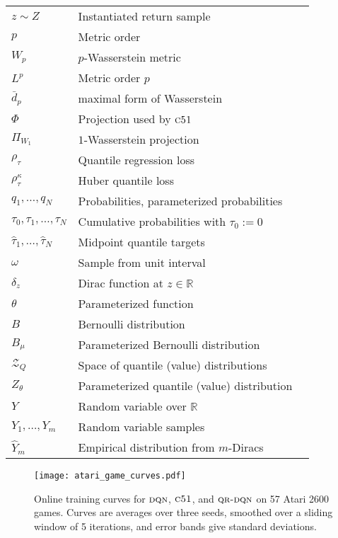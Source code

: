 \documentclass[letterpaper]{article}
\newcommand{\cZ}{\mathcal{Z}}
\def \cfo {\textsc{c51}}
\def \dqn {\textsc{dqn}}
\def \qrdqn {\textsc{qr-dqn}}
\def \dip {\bar d_p}
\def \qcZ {\cZ_{Q}}
\begin{document}
\begin{table}[ht]
\begin{tabular}{lll}
  $z \sim Z$    & Instantiated return sample \\
  $p$           & Metric order \\
  $W_p$         & $p$-Wasserstein metric \\
  $L^p$         & Metric order $p$ \\
  $\dip$        & maximal form of Wasserstein \\
  $\Phi$        & Projection used by $\cfo$\\
  $\Pi_{W_1}$   & $1$-Wasserstein projection \\
  $\rho_\tau$   & Quantile regression loss \\
  $\rho_\tau^\kappa$ & Huber quantile loss \\
  $q_1,\ldots,q_N$ & Probabilities, parameterized probabilities \\
  $\tau_0, \tau_1, \ldots, \tau_N$ & Cumulative probabilities with $\tau_0 := 0$\\
  $\hat{\tau}_1, \ldots, \hat{\tau}_N$ & Midpoint quantile targets\\
  $\omega$      & Sample from unit interval \\
  $\delta_z$    & Dirac function at $z \in \mathbb{R}$\\
  $\theta$      & Parameterized function \\
  $B$           & Bernoulli distribution \\
  $B_\mu$     & Parameterized Bernoulli distribution \\
  $\qcZ$        & Space of quantile (value) distributions \\
  $Z_\theta$    & Parameterized quantile (value) distribution \\
  $Y$           & Random variable over $\mathbb{R}$\\
  $Y_1, \ldots, Y_m$ & Random variable samples\\
  $\hat{Y}_m$   & Empirical distribution from $m$-Diracs
\end{tabular}
\end{table}

\begin{figure*}[t]
\begin{center}
\texttt{[image: atari\_game\_curves.pdf]}
\end{center}
\caption{Online training curves for $\dqn$, $\cfo$, and $\qrdqn$ on 57 Atari 2600 games. Curves are averages over three seeds, smoothed over a sliding window of 5 iterations, and error bands give standard deviations.\label{fig:all_games}}
\end{figure*}
\end{document}
